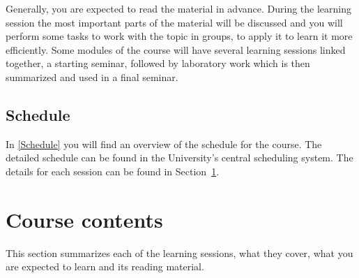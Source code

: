 Generally, you are expected to read the material in advance.
During the learning session the most important parts of the material will be 
discussed and you will perform some tasks to work with the topic in groups, 
\ie to apply it to learn it more efficiently.
Some modules of the course will have several learning sessions linked together,
\eg a starting seminar, followed by laboratory work which is then summarized 
and used in a final seminar.

\subsection{Schedule}

In \cref{Schedule} you will find an overview of the schedule for the course.
The detailed schedule can be found in the University's central scheduling 
system.
The details for each session can be found in Section~\ref{CourseContents}.

\begin{frame}[allowframebreaks]

\end{frame}


\section{Course contents}%
\label{CourseContents}

This section summarizes each of the learning sessions, \ie what they cover, 
what you are expected to learn and its reading material.

